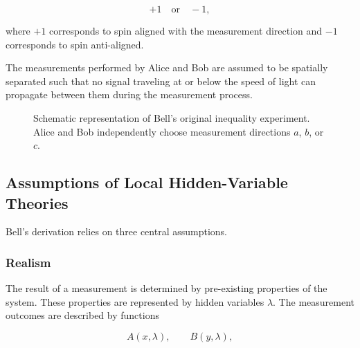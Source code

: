 \documentclass[14pt,a4paper]{extarticle}
\begin{document}
\[
+1 \quad \text{or} \quad -1,
\]

where $+1$ corresponds to spin aligned with the measurement direction and $-1$ corresponds to spin anti-aligned.

The measurements performed by Alice and Bob are assumed to be spatially separated such that no signal traveling at or below the speed of light can propagate between them during the measurement process.
\begin{figure}[h]
\centering
{}
\caption{Schematic representation of Bell's original inequality experiment. Alice and Bob independently choose measurement directions $a$, $b$, or $c$.}
\end{figure}

\subsection{Assumptions of Local Hidden-Variable Theories}

Bell’s derivation relies on three central assumptions.

\subsubsection{Realism}

The result of a measurement is determined by pre-existing properties of the system. These properties are represented by hidden variables $\lambda$. The measurement outcomes are described by functions

\[
A(x,\lambda), \qquad B(y,\lambda),
\]
\end{document}
